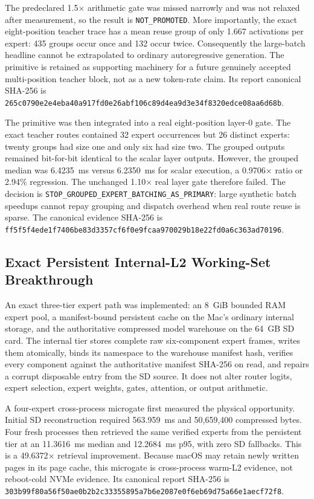 The predeclared 1.5$\times$ arithmetic gate was missed narrowly and was not
relaxed after measurement, so the result is \texttt{NOT\_PROMOTED}.  More
importantly, the exact eight-position teacher trace has a mean reuse group of
only 1.667 activations per expert: 435 groups occur once and 132 occur twice.
Consequently the large-batch headline cannot be extrapolated to ordinary
autoregressive generation.  The primitive is retained as supporting machinery
for a future genuinely accepted multi-position teacher block, not as a new
token-rate claim.  Its report canonical SHA-256 is
\texttt{265c0790e2e4eba40a917fd0e26abf106c89d4ea9d3e34f8320edce08aa6d68b}.

The primitive was then integrated into a real eight-position layer-0 gate.
The exact teacher routes contained 32 expert occurrences but 26 distinct
experts: twenty groups had size one and only six had size two.  The grouped
outputs remained bit-for-bit identical to the scalar layer outputs.  However,
the grouped median was 6.4235~ms versus 6.2350~ms for scalar execution, a
0.9706$\times$ ratio or 2.94\% regression.  The unchanged 1.10$\times$ real
layer gate therefore failed.  The decision is
\texttt{STOP\_GROUPED\_EXPERT\_BATCHING\_AS\_PRIMARY}: large synthetic batch
speedups cannot repay grouping and dispatch overhead when real route reuse is
sparse.  The canonical evidence SHA-256 is
\texttt{ff5f5f4ede1f7406be83d3357cf6f0e9fcaa970029b18e22fd0a6c363ad70196}.

\subsection{Exact Persistent Internal-L2 Working-Set Breakthrough}

An exact three-tier expert path was implemented: an 8~GiB bounded RAM expert
pool, a manifest-bound persistent cache on the Mac's ordinary internal storage,
and the authoritative compressed model warehouse on the 64~GB SD card.  The
internal tier stores complete raw six-component expert frames, writes them
atomically, binds its namespace to the warehouse manifest hash, verifies every
component against the authoritative manifest SHA-256 on read, and repairs a
corrupt disposable entry from the SD source.  It does not alter router logits,
expert selection, expert weights, gates, attention, or output arithmetic.

A four-expert cross-process microgate first measured the physical opportunity.
Initial SD reconstruction required 563.959~ms and 50,659,400 compressed bytes.
Four fresh processes then retrieved the same verified experts from the
persistent tier at an 11.3616~ms median and 12.2684~ms p95, with zero SD
fallbacks.  This is a 49.6372$\times$ retrieval improvement.  Because macOS may
retain newly written pages in its page cache, this microgate is cross-process
warm-L2 evidence, not reboot-cold NVMe evidence.  Its canonical report SHA-256
is
\texttt{303b99f80a56f50ae0b2b2c33355895a7b6e2087e0f6eb69d75a66e1aecf72f8}.

